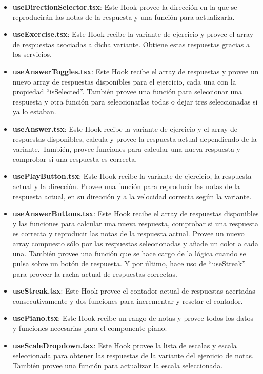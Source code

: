 \documentclass[12pt,twoside,titlepage]{report}
\begin{document}
\begin{itemize}
    \item \textbf{useDirectionSelector.tsx}: Este Hook provee la dirección en la que se reproducirán las notas de la respuesta y una función para actualizarla.
    \item \textbf{useExercise.tsx}: Este Hook recibe la variante de ejercicio y provee el array de respuestas asociadas a dicha variante. Obtiene estas respuestas gracias a los servicios.
    \item \textbf{useAnswerToggles.tsx}: Este Hook recibe el array de respuestas y provee un nuevo array de respuestas disponibles para el ejercicio, cada una con la propiedad ``isSelected''. También provee una función para seleccionar una respuesta y otra función para seleccionarlas todas o dejar tres seleccionadas si ya lo estaban.
    \item \textbf{useAnswer.tsx}: Este Hook recibe la variante de ejercicio y el array de respuestas disponibles, calcula y provee la respuesta actual dependiendo de la variante. También, provee funciones para calcular una nueva respuesta y comprobar si una respuesta es correcta.
    \item \textbf{usePlayButton.tsx}: Este Hook recibe la variante de ejercicio, la respuesta actual y la dirección. Provee una función para reproducir las notas de la respuesta actual, en su dirección y a la velocidad correcta según la variante.
    \item \textbf{useAnswerButtons.tsx}:  Este Hook recibe el array de respuestas disponibles y las funciones para calcular una nueva respuesta, comprobar si una respuesta es correcta y reproducir las notas de la respuesta actual. Provee un nuevo array compuesto sólo por las respuestas seleccionadas y añade un color a cada una. También provee una función que se hace cargo de la lógica cuando se pulsa sobre un botón de respuesta. Y por último, hace uso de ``useStreak'' para proveer la racha actual de respuestas correctas.
    \item \textbf{useStreak.tsx}: Este Hook provee el contador actual de respuestas acertadas consecutivamente y dos funciones para incrementar y resetar el contador.
    \item \textbf{usePiano.tsx}: Este Hook recibe un rango de notas y provee todos los datos y funciones necesarias para el componente piano.
    \item \textbf{useScaleDropdown.tsx}: Este Hook provee la lista de escalas y escala seleccionada para obtener las respuestas de la variante del ejercicio de notas. También provee una función para actualizar la escala seleccionada.
\end{itemize}
\end{document}
